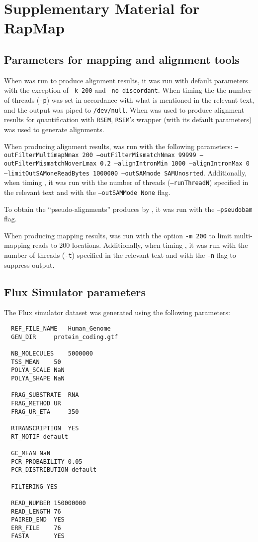 
\chapter{Supplementary Material for RapMap} %
\label{appendix-rapmap}

\section{Parameters for mapping and alignment tools}
\label{subsec:params}

When \bt was run to produce alignment results, it was run with default parameters with the exception of \texttt{-k 200} and \texttt{--no-discordant}.  When timing \bt the the number of threads (\texttt{-p}) was set in accordance with what is mentioned in the relevant text, and the output was piped to \texttt{/dev/null}.  When \bt was used to produce alignment results for quantification with \texttt{RSEM}, \texttt{RSEM}'s \bt wrapper (with its default parameters) was used to generate alignments.

When producing alignment results, \STAR was run with the following parameters: \texttt{--outFilterMultimapNmax 200 --outFilterMismatchNmax 99999 --outFilterMismatchNoverLmax 0.2 --alignIntronMin 1000 --alignIntronMax 0 --limitOutSAMoneReadBytes 1000000 --outSAMmode SAMUnosrted}.  Additionally, when timing \STAR, it was run with the number of threads (\texttt{--runThreadN}) specified in the relevant text and with the \texttt{--outSAMMode None} flag.


To obtain the ``pseudo-alignments'' produces by \kallisto, it was run with the \texttt{--pseudobam} flag.

When producing mapping results, \rapmap was run with the option \texttt{-m 200} to limit multi-mapping reads to 200 locations.  Additionally, when timing \rapmap, it was run with the number of threads (\texttt{-t}) specified in the relevant text and with the \texttt{-n} flag to suppress output.

\section{Flux Simulator parameters}
\label{subsec:flux_params}


The Flux simulator dataset was generated using the following parameters:

\begin{verbatim}
  REF_FILE_NAME   Human_Genome
  GEN_DIR     protein_coding.gtf

  NB_MOLECULES    5000000
  TSS_MEAN    50
  POLYA_SCALE NaN
  POLYA_SHAPE NaN

  FRAG_SUBSTRATE  RNA
  FRAG_METHOD UR
  FRAG_UR_ETA     350

  RTRANSCRIPTION  YES
  RT_MOTIF default

  GC_MEAN NaN
  PCR_PROBABILITY 0.05
  PCR_DISTRIBUTION default

  FILTERING YES

  READ_NUMBER 150000000
  READ_LENGTH 76
  PAIRED_END  YES
  ERR_FILE    76
  FASTA       YES
\end{verbatim}


